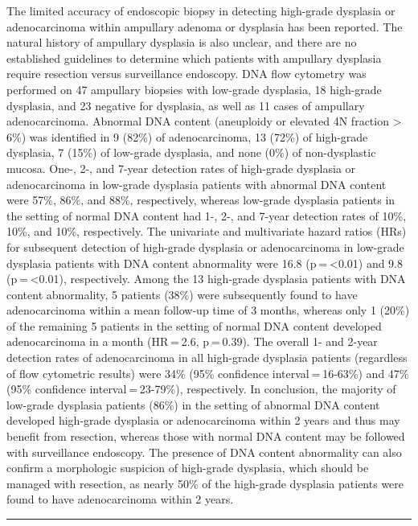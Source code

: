 \documentclass[]{article}
\begin{document}
The limited accuracy of endoscopic biopsy in detecting high-grade
dysplasia or adenocarcinoma within ampullary adenoma or dysplasia has
been reported. The natural history of ampullary dysplasia is also
unclear, and there are no established guidelines to determine which
patients with ampullary dysplasia require resection versus surveillance
endoscopy. DNA flow cytometry was performed on 47 ampullary biopsies
with low-grade dysplasia, 18 high-grade dysplasia, and 23 negative for
dysplasia, as well as 11 cases of ampullary adenocarcinoma. Abnormal DNA
content (aneuploidy or elevated 4N fraction \textgreater{} 6\%) was
identified in 9 (82\%) of adenocarcinoma, 13 (72\%) of high-grade
dysplasia, 7 (15\%) of low-grade dysplasia, and none (0\%) of
non-dysplastic mucosa. One-, 2-, and 7-year detection rates of
high-grade dysplasia or adenocarcinoma in low-grade dysplasia patients
with abnormal DNA content were 57\%, 86\%, and 88\%, respectively,
whereas low-grade dysplasia patients in the setting of normal DNA
content had 1-, 2-, and 7-year detection rates of 10\%, 10\%, and 10\%,
respectively. The univariate and multivariate hazard ratios (HRs) for
subsequent detection of high-grade dysplasia or adenocarcinoma in
low-grade dysplasia patients with DNA content abnormality were 16.8
(p = \textless{}0.01) and 9.8 (p = \textless{}0.01), respectively. Among
the 13 high-grade dysplasia patients with DNA content abnormality, 5
patients (38\%) were subsequently found to have adenocarcinoma within a
mean follow-up time of 3 months, whereas only 1 (20\%) of the remaining
5 patients in the setting of normal DNA content developed adenocarcinoma
in a month (HR = 2.6, p = 0.39). The overall 1- and 2-year detection
rates of adenocarcinoma in all high-grade dysplasia patients (regardless
of flow cytometric results) were 34\% (95\% confidence
interval = 16-63\%) and 47\% (95\% confidence interval = 23-79\%),
respectively. In conclusion, the majority of low-grade dysplasia
patients (86\%) in the setting of abnormal DNA content developed
high-grade dysplasia or adenocarcinoma within 2 years and thus may
benefit from resection, whereas those with normal DNA content may be
followed with surveillance endoscopy. The presence of DNA content
abnormality can also confirm a morphologic suspicion of high-grade
dysplasia, which should be managed with resection, as nearly 50\% of the
high-grade dysplasia patients were found to have adenocarcinoma within 2
years.

{}

{}

\begin{center}\rule{0.5\linewidth}{\linethickness}\end{center}
\end{document}
